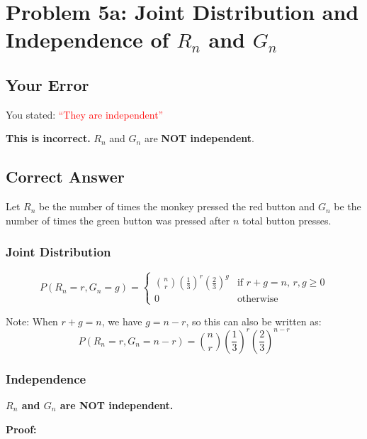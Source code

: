 \documentclass[12pt]{article}
\begin{document}
\newpage

\section*{Problem 5a: Joint Distribution and Independence of $R_n$ and $G_n$}

\subsection*{Your Error}

You stated: \textcolor{red}{``They are independent''}

\textbf{This is incorrect.} $R_n$ and $G_n$ are \textbf{NOT independent}.

\subsection*{Correct Answer}

Let $R_n$ be the number of times the monkey pressed the red button and $G_n$ be the number of times the green button was pressed after $n$ total button presses.

\subsubsection*{Joint Distribution}

\begin{equation*}
\boxed{P(R_n = r, G_n = g) = \begin{cases}
\displaystyle\binom{n}{r} \left(\frac{1}{3}\right)^r \left(\frac{2}{3}\right)^g & \text{if } r + g = n, \, r, g \geq 0 \\[10pt]
0 & \text{otherwise}
\end{cases}}
\end{equation*}

Note: When $r + g = n$, we have $g = n - r$, so this can also be written as:
\begin{equation*}
P(R_n = r, G_n = n-r) = \binom{n}{r} \left(\frac{1}{3}\right)^r \left(\frac{2}{3}\right)^{n-r}
\end{equation*}

\subsubsection*{Independence}

\textbf{$R_n$ and $G_n$ are NOT independent.}

\textbf{Proof:}
\end{document}
